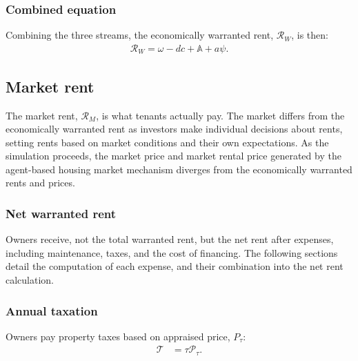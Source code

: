 \subsubsection{Combined equation}
Combining the three streams, the economically \gls{warranted rent}, $\mathcal{R}_W$, is then:%
\begin{align}
\mathcal{R}_W=\omega - {dc} + \mathbb{A} + a\psi.
\label{eqn-warranted-rent}
\end{align}

\subsection{Market rent} \label{sec:market-rent}
The \gls{market rent}, $\mathcal{R}_M$, is what tenants actually pay. The market differs from the economically warranted rent as investors make individual decisions about rents, setting rents based on market conditions and their own expectations. 
As the simulation proceeds, the market price and market rental price generated by the agent-based housing market mechanism diverges from the economically warranted  rents and prices.

\subsubsection{Net warranted rent} \label{section-net-rent}
Owners receive, not the total warranted rent, but the \gls{net rent} after expenses, including maintenance, taxes, and the cost of financing. The following sections detail the computation of each expense, and their combination into the net rent calculation.

\subsubsection{Annual taxation}
Owners pay property taxes based on appraised price, $P_{\tau}$:
\begin{align*}
\mathcal{T} &= \tau  \mathcal{P}_{\tau}.
\end{align*}
 
